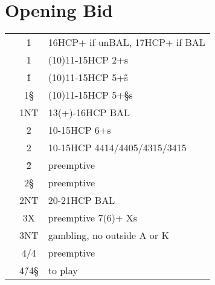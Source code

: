 
\hypertarget{open}{}
\chapter{Opening Bid}

\begin{longtable}{C{\linklength} C{\bidlength} l}
 & 1\C &16HCP+ if unBAL, 17HCP+ if BAL \\
 & 1\D &(10)11-15HCP 2+\D s\\
 &{1\H} &(10)11-15HCP 5+\H s\\
 &{1\S} &(10)11-15HCP 5+\S s\\
 &{1NT} &13(+)-16HCP BAL \\
 &{2\C} &10-15HCP 6+\C s\\
 &{2\D} &10-15HCP 4414/4405/4315/3415 \\
& 2\H &preemptive\\
& 2\S &preemptive\\
& 2NT &20-21HCP BAL \\
& 3X  &preemptive 7(6)+ Xs\\
& 3NT &gambling, no outside A or K\\
& 4\C/4\D & preemptive \\
& 4\H/4\S & to play \\
\end{longtable}